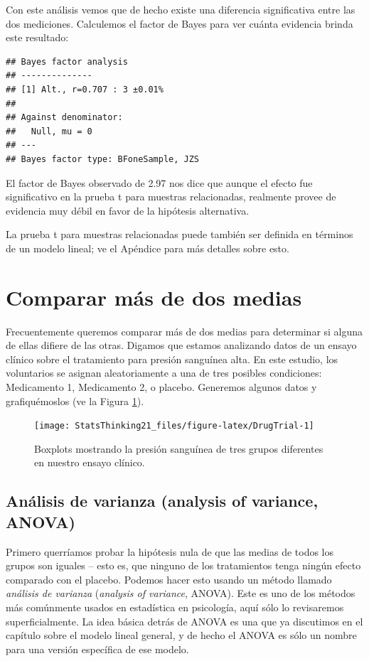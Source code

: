 \documentclass[
  12pt,
]{book}
\begin{document}
Con este análisis vemos que de hecho existe una diferencia significativa entre las dos mediciones. Calculemos el factor de Bayes para ver cuánta evidencia brinda este resultado:

\begin{verbatim}
## Bayes factor analysis
## --------------
## [1] Alt., r=0.707 : 3 ±0.01%
## 
## Against denominator:
##   Null, mu = 0 
## ---
## Bayes factor type: BFoneSample, JZS
\end{verbatim}

El factor de Bayes observado de 2.97 nos dice que aunque el efecto fue significativo en la prueba t para muestras relacionadas, realmente provee de evidencia muy débil en favor de la hipótesis alternativa.

La prueba t para muestras relacionadas puede también ser definida en términos de un modelo lineal; ve el Apéndice para más detalles sobre esto.

\hypertarget{comparar-muxe1s-de-dos-medias}{%
\section{Comparar más de dos medias}\label{comparar-muxe1s-de-dos-medias}}

Frecuentemente queremos comparar más de dos medias para determinar si alguna de ellas difiere de las otras. Digamos que estamos analizando datos de un ensayo clínico sobre el tratamiento para presión sanguínea alta. En este estudio, los voluntarios se asignan aleatoriamente a una de tres posibles condiciones: Medicamento 1, Medicamento 2, o placebo. Generemos algunos datos y grafiquémoslos (ve la Figura \ref{fig:DrugTrial}).

\begin{figure}
\texttt{[image: StatsThinking21\_files/figure-latex/DrugTrial-1]} \caption{Boxplots mostrando la presión sanguínea de tres grupos diferentes en nuestro ensayo clínico.}\label{fig:DrugTrial}
\end{figure}

\hypertarget{ANOVA}{%
\subsection{Análisis de varianza (analysis of variance, ANOVA)}\label{ANOVA}}

Primero querríamos probar la hipótesis nula de que las medias de todos los grupos son iguales -- esto es, que ninguno de los tratamientos tenga ningún efecto comparado con el placebo. Podemos hacer esto usando un método llamado \emph{análisis de varianza} (\emph{analysis of variance}, ANOVA). Este es uno de los métodos más comúnmente usados en estadística en psicología, aquí sólo lo revisaremos superficialmente. La idea básica detrás de ANOVA es una que ya discutimos en el capítulo sobre el modelo lineal general, y de hecho el ANOVA es sólo un nombre para una versión específica de ese modelo.
\end{document}
